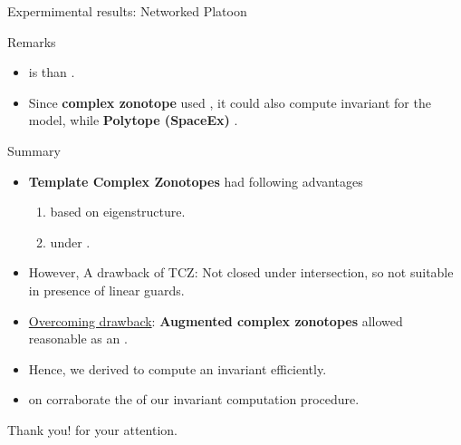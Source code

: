 \begin{frame}{Expermimental results: Networked Platoon}
\begin{table}
\begin{alertblock}{Remarks}
\begin{itemize}
\item {} is  than .
\item Since {\bf complex zonotope} used , it could also compute invariant for the  model, while  {\bf Polytope (SpaceEx)} .
\end{itemize}
\end{alertblock}
\end{table}
\end{frame}

\begin{frame}{Summary}
\begin{itemize}
\item {\bf Template Complex Zonotopes} had following advantages 
\begin{enumerate}
\item {} based on eigenstructure.
\item {} under .
\end{enumerate}
\item However, {\color{red} A drawback of TCZ: Not closed under intersection}, so {\color{red} not suitable} in presence of {\color{red} linear guards}.
\item \underline{Overcoming drawback}: {\bf {Augmented complex zonotopes}} allowed reasonable  as an .
\item Hence, we derived \underline{} to compute an invariant efficiently.
\item {} on  corraborate the  of our invariant computation procedure.
\end{itemize}
\end{frame}

\begin{frame}{}
\center
{\Huge {\color{blue} Thank you!}} {\Large for your attention.}
\end{frame}


















